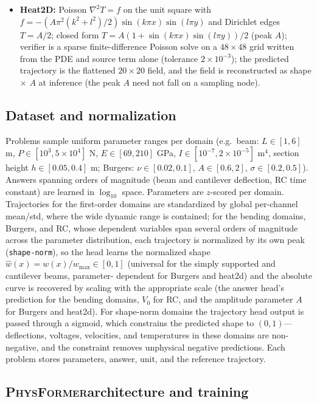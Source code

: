 \documentclass[11pt,a4paper]{article}
\newcommand{\PhysFormer}{\textsc{PhysFormer}}
\begin{document}
\begin{itemize}[leftmargin=1.6em,itemsep=1pt]
      is Euler integration at $\Delta t = 4\tau/4000$; tolerance $2\times10^{-3}$.
\item \textbf{Heat2D:} Poisson $\nabla^2 T = f$ on the unit square with
      $f = -(A\pi^2(k^2+l^2)/2)\sin(k\pi x)\sin(l\pi y)$ and Dirichlet
      edges $T=A/2$; closed form $T = A(1+\sin(k\pi x)\sin(l\pi y))/2$
      (peak $A$); verifier is a sparse finite-difference Poisson solve on a
      $48\times48$ grid written from the PDE and source term alone
      (tolerance $2\times10^{-3}$); the predicted trajectory is the
      flattened $20\times20$ field, and the field is reconstructed as
      shape $\times$ $A$ at inference (the peak $A$ need not fall on a
      sampling node).
\end{itemize}

\subsection*{Dataset and normalization}

Problems sample uniform parameter ranges per domain (e.g.\ beam:
$L\in[1,6]$ m, $P\in[10^3,5\times10^4]$ N, $E\in[69,210]$ GPa,
$I\in[10^{-7},2\times10^{-5}]$ m$^4$, section height $h\in[0.05,0.4]$ m;
Burgers: $\nu\in[0.02,0.1]$, $A\in[0.6,2]$, $\sigma\in[0.2,0.5]$).
Answers spanning orders of magnitude (beam and cantilever deflection, RC
time constant) are learned in $\log_{10}$ space. Parameters are $z$-scored
per domain. Trajectories for the first-order domains are standardized by
global per-channel mean/std, where the wide dynamic range is contained; for
the bending domains, Burgers, and RC, whose dependent variables span
several orders of magnitude across the parameter distribution, each
trajectory is normalized by its own peak (\texttt{shape-norm}), so the
head learns the normalized shape $\hat w(x)=w(x)/w_{\max}\in[0,1]$
(universal for the simply supported and cantilever beams, parameter-
dependent for Burgers and heat2d) and the absolute curve is recovered by
scaling with the appropriate scale (the answer head's prediction for the
bending domains, $V_0$ for RC, and the amplitude parameter $A$ for Burgers
and heat2d). For
shape-norm domains the trajectory head output is passed through a sigmoid,
which constrains the predicted shape to $(0,1)$---deflections, voltages,
velocities, and temperatures in these domains are non-negative, and the
constraint removes unphysical negative predictions. Each problem stores parameters,
answer, unit, and the reference trajectory.

\subsection*{\PhysFormer architecture and training}
\end{document}

